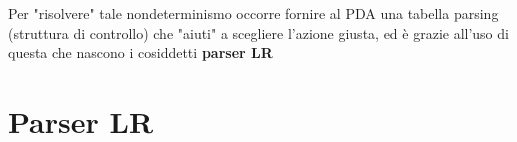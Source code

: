 
Per "risolvere" tale nondeterminismo occorre fornire al PDA una tabella parsing (struttura di controllo) che "aiuti" a scegliere l'azione giusta, ed è grazie all'uso di questa che nascono i cosiddetti \textbf{parser LR}

\section{Parser LR}
